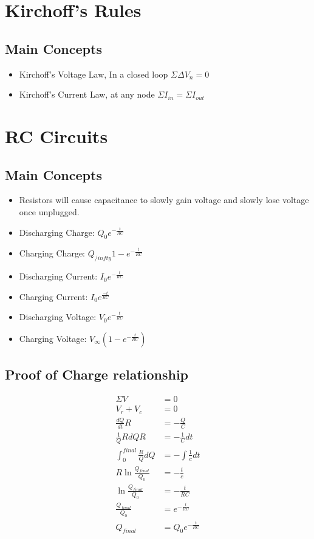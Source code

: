 \documentclass{article}
\begin{document}
\section{Kirchoff's Rules}
\subsection{Main Concepts}
\begin{itemize}
	\item Kirchoff's Voltage Law, In a closed loop $\Sigma\Delta V_n = 0 $
	\item Kirchoff's Current Law, at any node $\Sigma I_{in} = \Sigma I_{out}$ 
\end{itemize}
\section{RC Circuits}
\subsection{Main Concepts}
\begin{itemize}
	\item Resistors will cause capacitance to slowly gain voltage and slowly lose voltage once unplugged.
	\item Discharging Charge: $Q_0e^{-\frac{t}{RC}}$
	\item Charging Charge: $Q_{/infty}1-e^{-\frac{t}{RC}}$
	\item Discharging Current: $I_0e^{-\frac{t}{RC}}$
	\item Charging Current: $I_0e^{\frac{-t}{RC}}$
	\item Discharging Voltage: $V_0e^{-\frac{t}{RC}}$
	\item Charging Voltage: $V_{\infty}(1-e^{-\frac{t}{RC}})$


\end{itemize}
\subsection{Proof of Charge relationship}
\begin{align*}
	\Sigma V &= 0\\
	V_{r} + V_{c} &= 0\\
	\frac{dQ}{dt}R  &= - \frac{Q}{C}\\
	\frac{1}{Q}RdQ R &= -\frac{1}{C}dt\\
	\int^{final}_{0} \frac{R}{Q}dQ &= -\int \frac{1}{c}dt\\
	R\ln \frac{Q_{final}}{Q_0} &= -\frac{t}{c}\\
	\ln \frac{Q_{final}}{Q_0} &= -\frac{t}{RC}\\
	\frac{Q_{final}}{Q_0} &= e^{-\frac{t}{RC}}\\
	Q_{final} &= Q_0 e^{-\frac{t}{RC}}
\end{align*}
\end{document}
